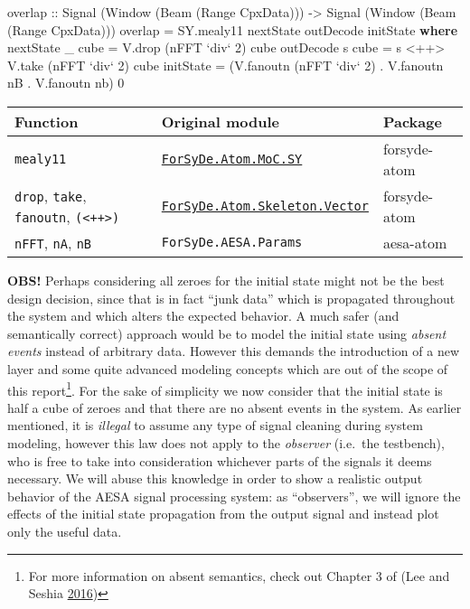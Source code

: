 \documentclass[
  a4paper,
]{article}
\newenvironment{Shaded}{}{}
\newcommand{\DataTypeTok}[1]{\textcolor[rgb]{0.56,0.13,0.00}{#1}}
\newcommand{\DecValTok}[1]{\textcolor[rgb]{0.25,0.63,0.44}{#1}}
\newcommand{\FunctionTok}[1]{\textcolor[rgb]{0.02,0.16,0.49}{#1}}
\newcommand{\KeywordTok}[1]{\textcolor[rgb]{0.00,0.44,0.13}{\textbf{#1}}}
\newcommand{\NormalTok}[1]{#1}
\newcommand{\OtherTok}[1]{\textcolor[rgb]{0.00,0.44,0.13}{#1}}
\begin{document}
\begin{Shaded}
\begin{Highlighting}[numbers=left,,firstnumber=270,]
\OtherTok{overlap ::} \DataTypeTok{Signal}\NormalTok{ (}\DataTypeTok{Window}\NormalTok{ (}\DataTypeTok{Beam}\NormalTok{ (}\DataTypeTok{Range} \DataTypeTok{CpxData}\NormalTok{)))}
        \OtherTok{->} \DataTypeTok{Signal}\NormalTok{ (}\DataTypeTok{Window}\NormalTok{ (}\DataTypeTok{Beam}\NormalTok{ (}\DataTypeTok{Range} \DataTypeTok{CpxData}\NormalTok{)))}
\NormalTok{overlap }\FunctionTok{=}\NormalTok{ SY.mealy11 nextState outDecode initState}
  \KeywordTok{where}
\NormalTok{    nextState _ cube }\FunctionTok{=}\NormalTok{ V.drop (nFFT }\OtherTok{`div`} \DecValTok{2}\NormalTok{) cube}
\NormalTok{    outDecode s cube }\FunctionTok{=}\NormalTok{ s }\FunctionTok{<++>}\NormalTok{ V.take (nFFT }\OtherTok{`div`} \DecValTok{2}\NormalTok{) cube}
\NormalTok{    initState        }\FunctionTok{=}\NormalTok{ (V.fanoutn (nFFT }\OtherTok{`div`} \DecValTok{2}\NormalTok{) }\FunctionTok{.}\NormalTok{ V.fanoutn nB }\FunctionTok{.}\NormalTok{ V.fanoutn nb) }\DecValTok{0}
\end{Highlighting}
\end{Shaded}

\begin{longtable}[]{@{}lll@{}}
\toprule
Function & Original module & Package\tabularnewline
\midrule
\endhead
\texttt{mealy11} &
\href{https://forsyde.github.io/forsyde-atom/api/ForSyDe-Atom-MoC-SY.html}{\texttt{ForSyDe.Atom.MoC.SY}}
& forsyde-atom\tabularnewline
\texttt{drop}, \texttt{take}, \texttt{fanoutn},
\texttt{(\textless{}++\textgreater{})} &
\href{https://forsyde.github.io/forsyde-atom/api/ForSyDe-Atom-Skeleton-Vector.html}{\texttt{ForSyDe.Atom.Skeleton.Vector}}
& forsyde-atom\tabularnewline
\texttt{nFFT}, \texttt{nA}, \texttt{nB} & \texttt{ForSyDe.AESA.Params} &
aesa-atom\tabularnewline
\bottomrule
\end{longtable}

\textbf{OBS!} Perhaps considering all zeroes for the initial state might
not be the best design decision, since that is in fact ``junk data''
which is propagated throughout the system and which alters the expected
behavior. A much safer (and semantically correct) approach would be to
model the initial state using \emph{absent events} instead of arbitrary
data. However this demands the introduction of a new layer and some
quite advanced modeling concepts which are out of the scope of this
report\footnote{For more information on absent semantics, check out
  Chapter 3 of (Lee and Seshia
  \protect\hyperlink{ref-leeseshia-15}{2016})}. For the sake of
simplicity we now consider that the initial state is half a cube of
zeroes and that there are no absent events in the system. As earlier
mentioned, it is \emph{illegal} to assume any type of signal cleaning
during system modeling, however this law does not apply to the
\emph{observer} (i.e.~the testbench), who is free to take into
consideration whichever parts of the signals it deems necessary. We will
abuse this knowledge in order to show a realistic output behavior of the
AESA signal processing system: as ``observers'', we will ignore the
effects of the initial state propagation from the output signal and
instead plot only the useful data.
\end{document}
